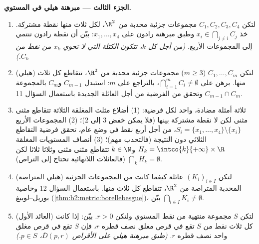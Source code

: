 \begin{problem}
\medskip
\noindent\textbf{الجزء الثالث --- مبرهنة هيلي في المستوي.}
\begin{enumerate}[resume]
  \item لتكن $C_1, C_2, C_3, C_4$ مجموعات جزئية محدبة من $\R^2$، لكل ثلاث منها
        نقطة مشتركة. خذ $x_i \in
        \bigcap_{j \neq i} C_j$ وطبق مبرهنة رادون على $x_1, \dots, x_4$: بيّن
        أن نقطة رادون تنتمي إلى المجموعات الأربع. \emph{(من أجل كل
        $k$، تتكون الكتلة التي لا تحوي $x_k$ من نقط من
        $C_k$.)}
  \item (هيلي) لتكن $C_1, \dots, C_m$ ($m \geq 3$) مجموعات جزئية محدبة من $\R^2$،
        تتقاطع كل ثلاث منها. برهن على $\bigcap_{i=1}^m C_i \neq \emptyset$، بالتراجع على $m$:
        استبدل $C_{m-1}$ و$C_m$ بالمجموعة $C_{m-1} \cap C_m$ وتحقق من الفرضية من
        أجل العائلة الجديدة باستعمال السؤال 11.
  \item ثلاثة أمثلة مضادة، واحد لكل فرضية: (1) أضلاع مثلث المغلقة
        الثلاثة تتقاطع مثنى مثنى لكن لا نقطة مشتركة بينها (فلا
        يمكن خفض $3$ إلى $2$)؛ (2) المجموعات الأربع $S_i = \{x_1, \dots, x_4\}
        \setminus \{x_i\}$،
        من أجل أربع نقط في وضع عام، تحقق فرضية التقاطع الثلاثي دون
        النتيجة (فالتحدب مهم)؛ (3) أنصاف المستويات المغلقة $H_k = \intco{k}{+\infty} \times
        \R$
        و$k \in \N$ تتقاطع مثنى مثنى وثلاثا ثلاثا لكن $\bigcap_k H_k = \emptyset$ (فالعائلات
        اللانهائية تحتاج إلى التراص).
  \item (هيلي المتراصة) لتكن $(K_i)_{i \in I}$ عائلة كيفما كانت من المجموعات
        الجزئية المحدبة المتراصة من $\R^2$، تتقاطع كل ثلاث منها.
        باستعمال السؤال 12 وخاصية بوريل--لوبيغ (\cref{thm:b2:metric:borellebesgue})، بيّن
        $\bigcap_{i \in I} K_i \neq \emptyset$.
  \item (العائد الأول) لتكن $S$ مجموعة منتهية من نقط المستوي
        ولتكن $r > 0$. بيّن: إذا كانت كل ثلاث نقط من $S$ تقع في
        قرص مغلق نصف قطره $r$، فإن $S$ تقع في قرص مغلق واحد
        نصف قطره $r$. \emph{(طبق مبرهنة هيلي على الأقراص $\overline D(p, r)$،
        $p \in S$.)}
\end{enumerate}


\end{problem}
